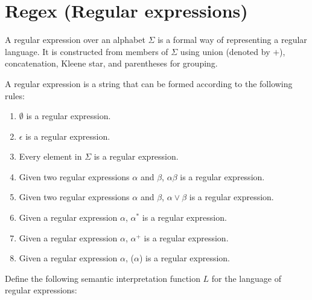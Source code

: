 \documentclass{article}
\begin{document}
\section{Regex (Regular expressions)}

A regular expression over an alphabet $\Sigma$ is a formal way of representing
a regular language. It is constructed from members of $\Sigma$ using union
(denoted by $+$), concatenation, Kleene star, and parentheses for grouping.

A regular expression is a string that can be formed according to the following rules:
\begin{enumerate}
	\item $\emptyset$ is a regular expression.
	\item $\epsilon$ is a regular expression.
	\item Every element in $\Sigma$ is a regular expression.
	\item Given two regular expressions $\alpha$ and $\beta$, $\alpha\beta$ is a regular expression.
	\item Given two regular expressions $\alpha$ and $\beta$, $\alpha \lor \beta$ is a regular expression.
	\item Given a regular expression $\alpha$, $\alpha^*$ is a regular expression.
	\item Given a regular expression $\alpha$, $\alpha^+$ is a regular expression.
	\item Given a regular expression $\alpha$, ($\alpha$) is a regular expression.
\end{enumerate}

Define the following semantic interpretation function \( L \) for the language of regular expressions:
\end{document}
